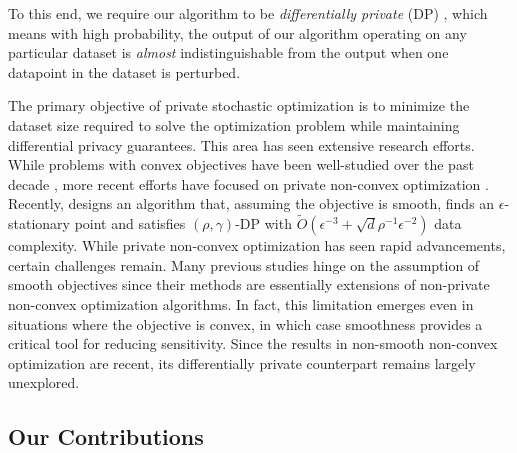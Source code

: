To this end, we require our algorithm to be \textit{differentially private} (DP) \citep{dwork2006calibrating}, which means with high probability, the output of our algorithm operating on any particular dataset is \textit{almost} indistinguishable from the output when one datapoint in the dataset is perturbed.

The primary objective of private stochastic optimization is to minimize the dataset size required to solve the optimization problem while maintaining differential privacy guarantees. 
This area has seen extensive research efforts.
While problems with convex objectives have been well-studied 
over the past decade 
\citep{chaudhuri2011differentially, jain2012differentially, kifer2012private, bassily2014private, talwar2014private, jain2014near, bassily2019private, feldman2020private, bassily2021noneuclidean, zhang2022differentially}, more recent efforts have focused on private non-convex optimization
\citep{wang2017differentially, wang2019differentially, tran2022momentum, wang2019efficient, zhou2020private, bassily2021differentially, arora2023faster}. 
Recently, \cite{arora2023faster} designs an algorithm that, assuming the objective is smooth, finds an $\epsilon$-stationary point and satisfies $(\rho,\gamma)$-DP with $\tilde O(\epsilon^{-3} + \sqrt{d}\rho^{-1}\epsilon^{-2})$ data complexity.
While private non-convex optimization has seen rapid advancements, certain challenges remain. Many previous studies hinge on the assumption of smooth objectives since their methods are essentially extensions of non-private non-convex optimization algorithms. 
In fact, this limitation emerges even in situations where the objective is convex, in which case smoothness provides a critical tool for reducing sensitivity.
Since the results in non-smooth non-convex optimization are recent, its differentially private counterpart remains largely unexplored.

\subsection{Our Contributions}

